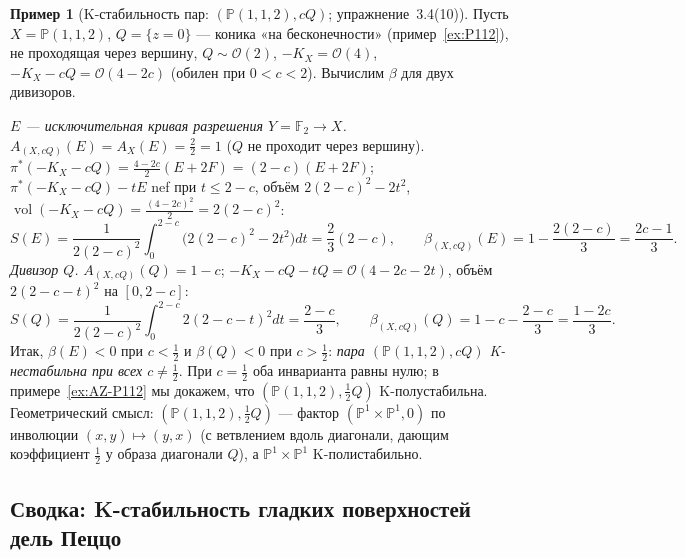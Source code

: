\documentclass[11pt,a4paper]{article}
\theoremstyle{plain}
\theoremstyle{definition}
\newtheorem{example}[theorem]{Пример}
\theoremstyle{remark}
\newcommand{\PP}{\mathbb{P}}
\newcommand{\cO}{\mathcal{O}}
\DeclareMathOperator{\vol}{vol}
\begin{document}
\begin{example}[K-стабильность пар: $(\PP(1,1,2),cQ)$; упражнение~3.4(10)]\label{ex:P112-pair}
Пусть $X=\PP(1,1,2)$, $Q=\{z=0\}$ --- коника «на бесконечности» (пример~\ref{ex:P112}), не
проходящая через вершину, $Q\sim\cO(2)$, $-K_X=\cO(4)$, $-K_X-cQ=\cO(4-2c)$ (обилен при $0<c<2$).
Вычислим $\beta$ для двух дивизоров.

\emph{$E$ --- исключительная кривая разрешения $Y=\mathbb F_2\to X$.} $A_{(X,cQ)}(E)=A_X(E)=\frac22=1$
($Q$ не проходит через вершину). $\pi^*(-K_X-cQ)=\frac{4-2c}2(E+2F)=(2-c)(E+2F)$;
$\pi^*(-K_X-cQ)-tE$ nef при $t\le2-c$, объём $2(2-c)^2-2t^2$, $\vol(-K_X-cQ)=\frac{(4-2c)^2}2=2(2-c)^2$:
\[
S(E)=\frac1{2(2-c)^2}\int_0^{2-c}\big(2(2-c)^2-2t^2\big)dt=\frac23(2-c),\qquad
\beta_{(X,cQ)}(E)=1-\frac{2(2-c)}3=\frac{2c-1}3 .
\]
\emph{Дивизор $Q$.} $A_{(X,cQ)}(Q)=1-c$; $-K_X-cQ-tQ=\cO(4-2c-2t)$, объём $2(2-c-t)^2$ на $[0,2-c]$:
\[
S(Q)=\frac1{2(2-c)^2}\int_0^{2-c}2(2-c-t)^2dt=\frac{2-c}3,\qquad
\beta_{(X,cQ)}(Q)=1-c-\frac{2-c}3=\frac{1-2c}3 .
\]
Итак, $\beta(E)<0$ при $c<\frac12$ и $\beta(Q)<0$ при $c>\frac12$: \emph{пара $(\PP(1,1,2),cQ)$
K-нестабильна при всех $c\ne\frac12$}. При $c=\frac12$ оба инварианта равны нулю; в
примере~\ref{ex:AZ-P112} мы докажем, что $(\PP(1,1,2),\frac12Q)$ K-полустабильна. Геометрический
смысл: $(\PP(1,1,2),\frac12Q)$ --- фактор $(\PP^1\times\PP^1,0)$ по инволюции $(x,y)\mapsto(y,x)$
(с ветвлением вдоль диагонали, дающим коэффициент $\frac12$ у образа диагонали $Q$), а
$\PP^1\times\PP^1$ K-полистабильно.
\end{example}

\subsection{Сводка: K-стабильность гладких поверхностей дель Пеццо}
\end{document}
